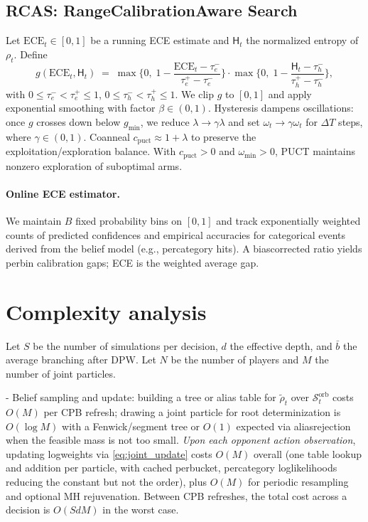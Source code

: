 \documentclass[10pt]{article}
\newcommand{\1}{\mathbf{1}}
\theoremstyle{plain}
\begin{document}
\subsection{RCAS: Range\textendash Calibration\textendash Aware Search}
\label{sec:rcas}
Let $\mathrm{ECE}_t\in[0,1]$ be a running ECE estimate and $\mathsf{H}_t$ the normalized entropy of $\rho_t$. Define
\[
g(\mathrm{ECE}_t,\mathsf{H}_t)\;=\;\max\!\Big\{0,\; 1 - \frac{\mathrm{ECE}_t-\tau_e^-}{\tau_e^+-\tau_e^-}\Big\}\cdot \max\!\Big\{0,\; 1 - \frac{\mathsf{H}_t-\tau_h^-}{\tau_h^+-\tau_h^-}\Big\},
\]
with $0\le \tau_e^-<\tau_e^+\le 1$, $0\le \tau_h^-<\tau_h^+\le 1$. We clip $g$ to $[0,1]$ and apply exponential smoothing with factor $\beta\in(0,1)$. Hysteresis dampens oscillations: once $g$ crosses down below $g_{\min}$, we reduce $\lambda\to \gamma\lambda$ and set $\omega_t\to \gamma\omega_t$ for $\Delta T$ steps, where $\gamma\in(0,1)$. Co\textendash anneal $c_{\text{puct}}\approx 1+\lambda$ to preserve the exploitation/exploration balance. With $c_{\text{puct}}>0$ and $\omega_{\min}>0$, PUCT maintains nonzero exploration of suboptimal arms.

\paragraph{Online ECE estimator.}
We maintain $B$ fixed probability bins on $[0,1]$ and track exponentially weighted counts of predicted confidences and empirical accuracies for categorical events derived from the belief model (e.g., per\textendash category hits). A bias\textendash corrected ratio yields per\textendash bin calibration gaps; ECE is the weighted average gap.

\section{Complexity analysis}
Let $S$ be the number of simulations per decision, $d$ the effective depth, and $\bar b$ the average branching after DPW. Let $N$ be the number of players and $M$ the number of joint particles.

- Belief sampling and update: building a tree or alias table for $\tilde\rho_t$ over $\mathcal{S}_t^{\text{orb}}$ costs $O(M)$ per CPB refresh; drawing a joint particle for root determinization is $O(\log M)$ with a Fenwick/segment tree or $O(1)$ expected via alias\textendash rejection when the feasible mass is not too small. \emph{Upon each opponent action observation}, updating log\textendash weights via \eqref{eq:joint_update} costs $O(M)$ overall (one table lookup and addition per particle, with cached per\textendash bucket, per\textendash category log\textendash likelihoods reducing the constant but not the order), plus $O(M)$ for periodic resampling and optional MH rejuvenation. Between CPB refreshes, the total cost across a decision is $O(S d M)$ in the worst case.
\end{document}
